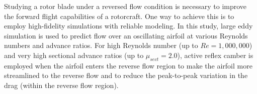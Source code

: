 Studying a rotor blade under a reversed flow condition
is necessary to improve the forward flight capabilities of a rotorcraft.
One way to achieve this is to employ high-fidelity simulations with reliable modeling.
In this study, large eddy simulation is used to predict flow over an oscillating airfoil at various Reynolds numbers and advance ratios.
For high Reynolds number (up to $Re=1,000,000$) and very high sectional advance ratios (up to $\mu_{sect}=2.0$), active reflex camber is employed when the airfoil enters
the reverse flow region to make the airfoil more streamlined to the reverse flow and to reduce
the peak-to-peak variation in the drag (within the reverse flow region).



